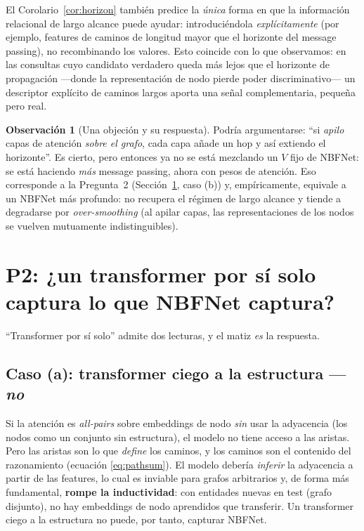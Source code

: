 \documentclass[11pt]{article}
\theoremstyle{plain}
\theoremstyle{definition}
\newtheorem{remark}[proposition]{Observación}
\begin{document}
El Corolario~\ref{cor:horizon} también predice la \emph{única} forma en que la información relacional
de largo alcance puede ayudar: introduciéndola \emph{explícitamente} (por ejemplo, features de caminos
de longitud mayor que el horizonte del message passing), no recombinando los valores. Esto coincide con
lo que observamos: en las consultas cuyo candidato verdadero queda más lejos que el horizonte de
propagación ---donde la representación de nodo pierde poder discriminativo--- un descriptor explícito de
caminos largos aporta una señal complementaria, pequeña pero real.

\begin{remark}[Una objeción y su respuesta]
Podría argumentarse: ``si \emph{apilo} capas de atención \emph{sobre el grafo}, cada capa añade un hop
y así extiendo el horizonte''. Es cierto, pero entonces ya no se está mezclando un $V$ fijo de NBFNet:
se está haciendo \emph{más} message passing, ahora con pesos de atención. Eso corresponde a la
Pregunta~2 (Sección~\ref{sec:q2}, caso (b)) y, empíricamente, equivale a un NBFNet más profundo: no
recupera el régimen de largo alcance y tiende a degradarse por \emph{over-smoothing}
\cite{oono} (al apilar capas, las representaciones de los nodos se vuelven mutuamente
indistinguibles).
\end{remark}

\section{P2: ¿un transformer por sí solo captura lo que NBFNet captura?}
\label{sec:q2}

``Transformer por sí solo'' admite dos lecturas, y el matiz \emph{es} la respuesta.

\subsection{Caso (a): transformer ciego a la estructura --- \emph{no}}

Si la atención es \emph{all-pairs} sobre embeddings de nodo \emph{sin} usar la adyacencia (los nodos
como un conjunto sin estructura), el modelo no tiene acceso a las aristas. Pero las aristas son lo que
\emph{define} los caminos, y los caminos son el contenido del razonamiento (ecuación
\eqref{eq:pathsum}). El modelo debería \emph{inferir} la adyacencia a partir de las features, lo cual
es inviable para grafos arbitrarios y, de forma más fundamental, \textbf{rompe la inductividad}: con
entidades nuevas en test (grafo disjunto), no hay embeddings de nodo aprendidos que transferir. Un
transformer ciego a la estructura no puede, por tanto, capturar NBFNet.
\end{document}
